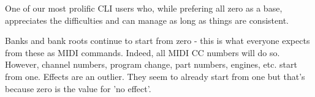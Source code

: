    One of our most prolific CLI users who, while prefering all zero as a base,
   appreciates the difficulties and can manage as long as things are consistent.

   Banks and bank roots continue to start from zero - this is what everyone
   expects from these as MIDI commands. Indeed, all MIDI
   CC numbers will do so. However, channel numbers, program change, part
   numbers, engines, etc. start from one. Effects are an outlier. They seem
   to already start from one but that's because zero is the value for 'no
   effect'.

